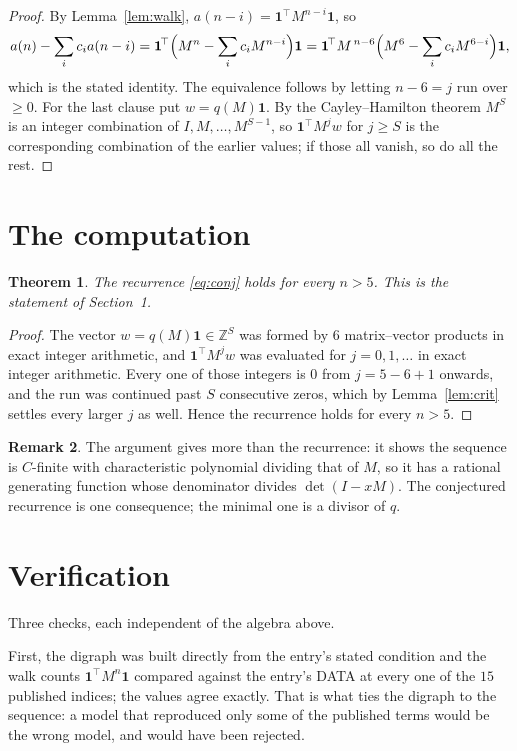 \documentclass[11pt,a4paper]{article}
\theoremstyle{plain}
\newtheorem{theorem}{Theorem}
\theoremstyle{definition}
\newtheorem{remark}[theorem]{Remark}
\begin{document}
\begin{proof}
By Lemma~\ref{lem:walk}, $a(n-i)=\mathbf{1}^{\!\top}M^{n-i}\mathbf{1}$, so
\[
a(n)-\sum_i c_i a(n-i)
=\mathbf{1}^{\!\top}\Bigl(M^{n}-\sum_i c_i M^{n-i}\Bigr)\mathbf{1}
=\mathbf{1}^{\!\top}M^{\,n-6}\Bigl(M^{6}-\sum_i c_i M^{6-i}\Bigr)\mathbf{1},
\]
which is the stated identity. The equivalence follows by letting $n-6=j$ run over
$\ge0$. For the last clause put $w=q(M)\mathbf{1}$. By the Cayley--Hamilton theorem
$M^{S}$ is an integer combination of $I,M,\dots,M^{S-1}$, so
$\mathbf{1}^{\!\top}M^{j}w$ for $j\ge S$ is the corresponding combination of the
earlier values; if those all vanish, so do all the rest.
\end{proof}

\section{The computation}

\begin{theorem}
The recurrence \eqref{eq:conj} holds for every $n>5$. This is the statement of
Section~1.
\end{theorem}

\begin{proof}
The vector $w=q(M)\mathbf{1}\in\mathbb{Z}^{S}$ was formed by $6$ matrix--vector
products in exact integer arithmetic, and $\mathbf{1}^{\!\top}M^{j}w$ was evaluated for
$j=0,1,\dots$ in exact integer arithmetic. Every one of those integers is $0$ from
$j=5-6+1$ onwards, and the run was continued past $S$ consecutive zeros, which by
Lemma~\ref{lem:crit} settles every larger $j$ as well. Hence the recurrence holds for
every $n>5$.
\end{proof}

\begin{remark}
The argument gives more than the recurrence: it shows the sequence is $C$-finite with
characteristic polynomial dividing that of $M$, so it has a rational generating function
whose denominator divides $\det(I-xM)$. The conjectured recurrence is one consequence; the
minimal one is a divisor of $q$.
\end{remark}

\section{Verification}

Three checks, each independent of the algebra above.

First, the digraph was built directly from the entry's stated condition and the walk counts
$\mathbf{1}^{\!\top}M^{n}\mathbf{1}$ compared against the entry's DATA at every one of
the $15$ published indices; the values agree exactly. That is what ties the digraph to
the sequence: a model that reproduced only some of the published terms would be the wrong
model, and would have been rejected.
\end{document}
